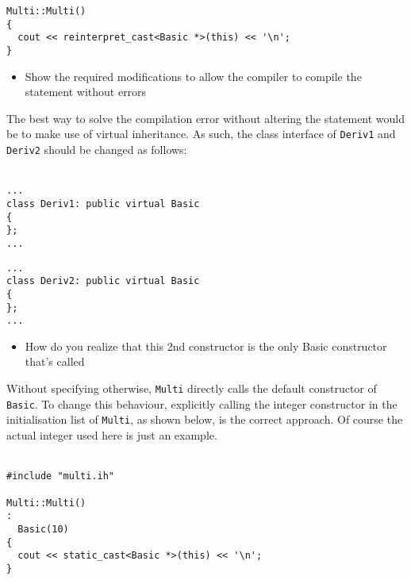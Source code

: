 \begin{lstlisting}[style=in, caption=c\_multi.cc]
Multi::Multi()
{
  cout << reinterpret_cast<Basic *>(this) << '\n';
}
\end{lstlisting}

\begin{itemize}
  \item Show the required modifications to allow the compiler to compile the statement without errors
\end{itemize}

The best way to solve the compilation error without altering the statement would be to make use of virtual inheritance. As such, the class interface of \texttt{Deriv1} and \texttt{Deriv2} should be changed as follows: \\~\\

\begin{lstlisting}[style=in, caption=deriv1.h]
...
class Deriv1: public virtual Basic
{
};
...
\end{lstlisting}
\begin{lstlisting}[style=in, caption=deriv2.h]
...
class Deriv2: public virtual Basic
{
};
...
\end{lstlisting}

\begin{itemize}
  \item How do you realize that this 2nd constructor is the only Basic constructor that's called
\end{itemize}
Without specifying otherwise, \texttt{Multi} directly calls the default constructor of \texttt{Basic}. To change this behaviour, explicitly calling the integer constructor in the initialisation list of \texttt{Multi}, as shown below, is the correct approach. Of course the actual integer used here is just an example. \\~\\
\begin{lstlisting}[style=in, caption=c\_multi.cc]
#include "multi.ih"

Multi::Multi()
:
  Basic(10)
{
  cout << static_cast<Basic *>(this) << '\n';
}
\end{lstlisting}
